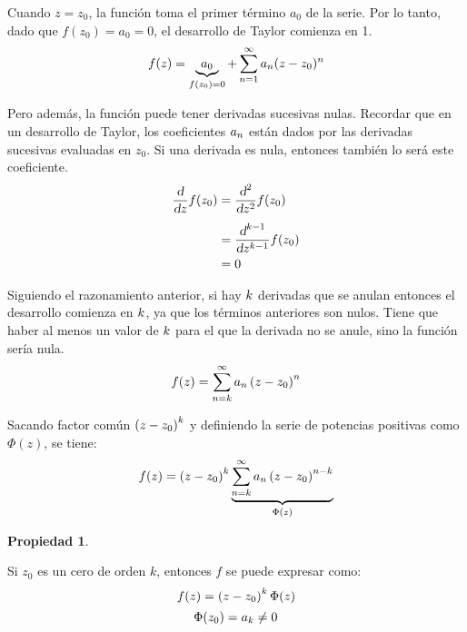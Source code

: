 \documentclass[a5paper,12pt,twoside]{book}
\newtheorem{prop}{{Propiedad}}[chapter]
\begin{document}
Cuando $z=z_0$, la función toma el primer término $a_0$ de la serie. Por lo tanto, dado que $f(z_0) = a_0 = 0$, el desarrollo de Taylor comienza en 1.
\begin{equation*}
    f(z) = \underbrace{a_0}_{f(z_0)=0} + \sum_{n=1}^\infty a_n (z-z_0)^n
\end{equation*}

Pero además, la función puede tener derivadas sucesivas nulas. Recordar que en un desarrollo de Taylor, los coeficientes $a_n$ están dados por las derivadas sucesivas evaluadas en $z_0$. Si una derivada es nula, entonces también lo será este coeficiente.
\begin{align*}
    \frac{\textsl{d}}{\textsl{d} z} f(z_0) &= \frac{\textsl{d}^2}{\textsl{d} z^2} f(z_0)
    \\[1ex]
    &= \frac{\textsl{d}^{k-1}}{\textsl{d} z^{k-1}} f(z_0)
    \\
    &= 0
\end{align*}

Siguiendo el razonamiento anterior, si hay $k$ derivadas que se anulan entonces el desarrollo comienza en $k$, ya que los términos anteriores son nulos. Tiene que haber al menos un valor de $k$ para el que la derivada no se anule, sino la función sería nula.
\begin{equation*}
    f(z) = \sum_{n=k}^\infty a_n \left(z-z_0\right)^n
\end{equation*}

Sacando factor común $\left(z-z_0\right)^k$ y definiendo la serie de potencias positivas como $\Phi(z)$, se tiene:
\begin{equation*}
    f(z) = \left(z-z_0\right)^k \underbrace{\sum_{n=k}^\infty a_n \left(z-z_0\right)^{n-k}}_{\Phi (z)}
\end{equation*}

\begin{mdframed}[style=MyFrame1]
    \begin{prop}
    \end{prop}
    Si $z_0$ es un cero de orden $k$, entonces $f$ se puede expresar como:
    \begin{equation*}
        f(z) = \left(z-z_0\right)^k \Phi (z)
    \end{equation*}
    \begin{equation*}
        \Phi (z_0) = a_k \neq 0
    \end{equation*}
\end{mdframed}
\end{document}
